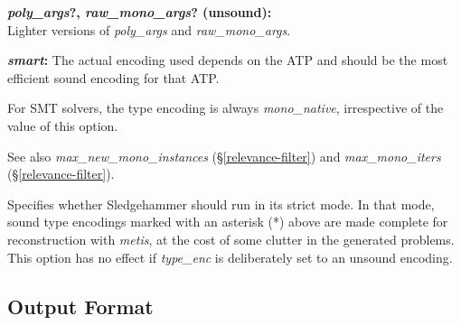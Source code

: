\documentclass[a4paper,12pt]{article}
\begin{document}
\begin{enum}
\begin{enum}
\item[\labelitemi] \textbf{\textit{poly\_args}?, \textit{raw\_mono\_args}? (unsound):} \\
Lighter versions of \textit{poly\_args} and \textit{raw\_mono\_args}.

\item[\labelitemi] \textbf{\textit{smart}:} The actual encoding used depends on
the ATP and should be the most efficient sound encoding for that ATP.
\end{enum}

For SMT solvers, the type encoding is always \textit{mono\_native}, irrespective
of the value of this option.

\nopagebreak
{\small See also \textit{max\_new\_mono\_instances} (\S\ref{relevance-filter})
and \textit{max\_mono\_iters} (\S\ref{relevance-filter}).}

Specifies whether Sledgehammer should run in its strict mode. In that mode,
sound type encodings marked with an asterisk (*) above are made complete
for reconstruction with \textit{metis}, at the cost of some clutter in the
generated problems. This option has no effect if \textit{type\_enc} is
deliberately set to an unsound encoding.
\end{enum}

\subsection{Output Format}
\label{output-format}
\end{document}
